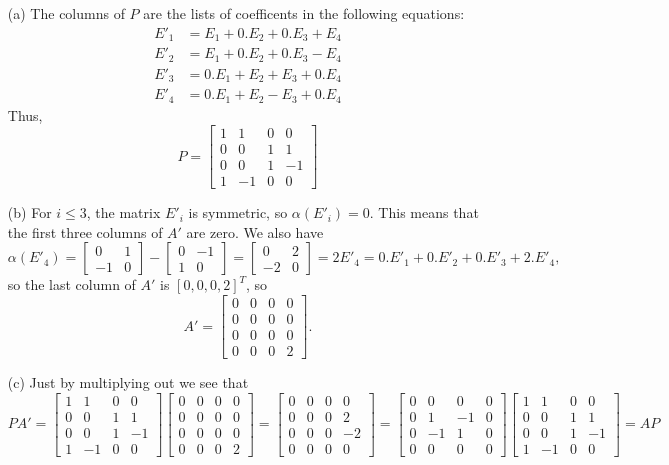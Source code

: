 \documentclass{amsart}
\newcommand{\bsm}       {\left[\begin{smallmatrix}}
\newcommand{\esm}       {\end{smallmatrix}\right]}
\newcommand{\al}        {\alpha}
\renewcommand{\:}       {\colon}
\theoremstyle{definition}
\renewenvironment{solution}{\SolutionAtEnd}{\endSolutionAtEnd}
\begin{document}
\begin{solution}
 \begin{itemize}
  \item[(a)] The columns of $P$ are the lists of coefficents
   in the following equations:
   \begin{align*}
    E'_1 &= E_1 + 0.E_2 + 0.E_3 + E_4 \\
    E'_2 &= E_1 + 0.E_2 + 0.E_3 - E_4 \\
    E'_3 &= 0.E_1 + E_2 + E_3 + 0.E_4 \\
    E'_4 &= 0.E_1 + E_2 - E_3 + 0.E_4
   \end{align*}
   Thus,
   {\tiny \[ P =
      \bsm 1&1&0&0 \\ 0&0&1&1 \\ 0&0&1&-1 \\ 1&-1&0&0 \esm
   \]}
  \item[(b)] For $i\leq 3$, the matrix $E'_i$ is symmetric,
   so $\al(E'_i)=0$.  This means that the first three
   columns of $A'$ are zero.  We also have
   \[ \al(E'_4) = \bsm 0&1\\-1&0\esm - \bsm 0&-1\\1&0\esm = 
        \bsm 0&2\\-2&0 \esm = 2E'_4
        =0.E'_1+0.E'_2+0.E'_3+2.E'_4,
   \]
   so the last column of $A'$ is $[0,0,0,2]^T$, so 
   {\tiny \[
    A' = \bsm 0&0&0&0 \\ 0&0&0&0 \\ 0&0&0&0 \\ 0&0&0&2 \esm.
   \]}
  \item[(c)] Just by multiplying out we see that
   {\tiny \[
    PA' = 
     \bsm 1&1&0&0 \\ 0&0&1&1 \\ 0&0&1&-1 \\ 1&-1&0&0 \esm
     \bsm 0&0&0&0 \\ 0&0&0&0 \\ 0&0&0&0 \\ 0&0&0&2 \esm =
     \bsm 0&0&0&0 \\ 0&0&0&2 \\ 0&0&0&-2 \\ 0&0&0&0 \esm =
     \bsm 0&0&0&0 \\ 0&1&-1&0 \\ 0&-1&1&0\\ 0&0&0&0 \esm
     \bsm 1&1&0&0 \\ 0&0&1&1 \\ 0&0&1&-1 \\ 1&-1&0&0 \esm = 
    AP
   \]}
 \end{itemize}
\end{solution}
\end{document}
